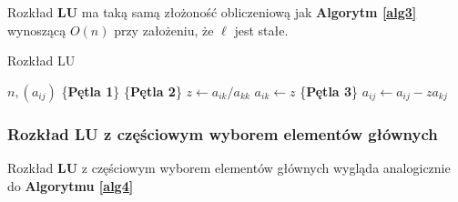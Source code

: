\documentclass[12pt]{article}
\begin{document}
Rozkład \textbf{LU} ma taką samą złożoność obliczeniową jak \textbf{Algorytm \ref{alg3}} wynoszącą $O(n)$ przy założeniu, że $\ell$ jest stałe.
\begin{algorithm} %
\caption{Rozkład LU}
\label{alg5} %
\begin{algorithmic} %
    \REQUIRE $n, (a_{ij})$
    \STATE \{\textbf{Pętla 1}\}
    		\STATE \{\textbf{Pętla 2}\}
		\STATE $z \leftarrow a_{ik}/a_{kk}$
		\STATE $a_{ik} \leftarrow z$
    			\STATE \{\textbf{Pętla 3}\}
				\STATE $a_{ij} \leftarrow a_{ij} - z a_{kj}$
    			\ENDFOR
    		\ENDFOR
    \ENDFOR
\end{algorithmic}
\end{algorithm}

\subsubsection*{Rozkład LU z częściowym wyborem elementów głównych}
Rozkład \textbf{LU} z częściowym wyborem elementów głównych wygląda analogicznie do \textbf{Algorytmu \ref{alg4}}
\end{document}
